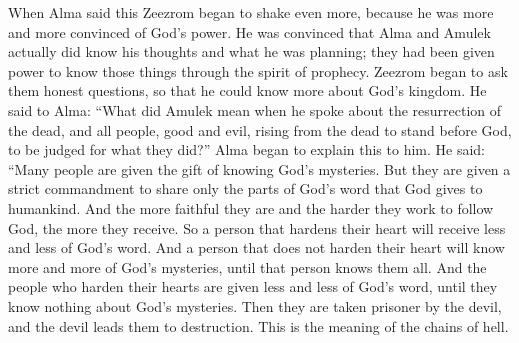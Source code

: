 When Alma said this Zeezrom began to shake even more, because he was more and more convinced of God's power. He was convinced that Alma and Amulek actually did know his thoughts and what he was planning; they had been given power to know those things through the spirit of prophecy.
\bverse \iffalse And Zeezrom began to inquire of them diligently, that he might know more concerning the kingdom of God. And he said unto Alma: What does this mean which Amulek hath spoken concerning the resurrection of the dead, that all shall rise from the dead, both the just and the unjust, and are brought to stand before God to be judged according to their works? \fi
Zeezrom began to ask them honest questions, so that he could know more about God's kingdom. He said to Alma: ``What did Amulek mean when he spoke about the resurrection of the dead, and all people, good and evil, rising from the dead to stand before God, to be judged for what they did?''
\bverse \iffalse And now Alma began to expound these things unto him, saying: It is given unto many to know the mysteries of God; nevertheless they are laid under a strict command that they shall not impart only according to the portion of his word which he doth grant unto the children of men, according to the heed and diligence which they give unto him. \fi
Alma began to explain this to him. He said: ``Many people are given the gift of knowing God's mysteries. But they are given a strict commandment to share only the parts of God's word that God gives to humankind. And the more faithful they are and the harder they work to follow God, the more they receive.
\bverse \iffalse And therefore, he that will harden his heart, the same receiveth the lesser portion of the word; and he that will not harden his heart, to him is given the greater portion of the word, until it is given unto him to know the mysteries of God until he know them in full. \fi
So a person that hardens their heart will receive less and less of God's word. And a person that does not harden their heart will know more and more of God's mysteries, until that person knows them all.
\bverse \iffalse And they that will harden their hearts, to them is given the lesser portion of the word until they know nothing concerning his mysteries; and then they are taken captive by the devil, and led by his will down to destruction. Now this is what is meant by the chains of hell. \fi
And the people who harden their hearts are given less and less of God's word, until they know nothing about God's mysteries. Then they are taken prisoner by the devil, and the devil leads them to destruction. This is the meaning of the chains of hell.
